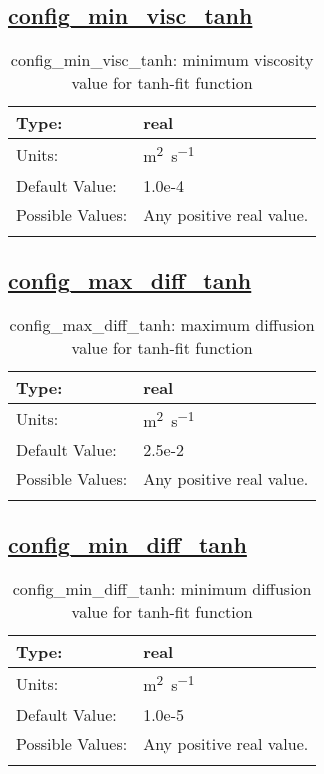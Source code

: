 \subsection[config\_min\_visc\_tanh]{\hyperref[sec:nm_tab_vmix_tanh]{config\_min\_visc\_tanh}}
\label{subsec:nm_sec_config_min_visc_tanh}
\begin{center}
\begin{longtable}{| p{2.0in} || p{4.0in} |}
    \hline
    Type: & real \\
    \hline
    Units: & \si{m^2.s^{-1}} \\
    \hline
    Default Value: & 1.0e-4 \\
    \hline
    Possible Values: & Any positive real value. \\
    \hline
    \caption{config\_min\_visc\_tanh: minimum viscosity value for tanh-fit function}
\end{longtable}
\end{center}
\subsection[config\_max\_diff\_tanh]{\hyperref[sec:nm_tab_vmix_tanh]{config\_max\_diff\_tanh}}
\label{subsec:nm_sec_config_max_diff_tanh}
\begin{center}
\begin{longtable}{| p{2.0in} || p{4.0in} |}
    \hline
    Type: & real \\
    \hline
    Units: & \si{m^2.s^{-1}} \\
    \hline
    Default Value: & 2.5e-2 \\
    \hline
    Possible Values: & Any positive real value. \\
    \hline
    \caption{config\_max\_diff\_tanh: maximum diffusion value for tanh-fit function}
\end{longtable}
\end{center}
\subsection[config\_min\_diff\_tanh]{\hyperref[sec:nm_tab_vmix_tanh]{config\_min\_diff\_tanh}}
\label{subsec:nm_sec_config_min_diff_tanh}
\begin{center}
\begin{longtable}{| p{2.0in} || p{4.0in} |}
    \hline
    Type: & real \\
    \hline
    Units: & \si{m^2.s^{-1}} \\
    \hline
    Default Value: & 1.0e-5 \\
    \hline
    Possible Values: & Any positive real value. \\
    \hline
    \caption{config\_min\_diff\_tanh: minimum diffusion value for tanh-fit function}
\end{longtable}
\end{center}
